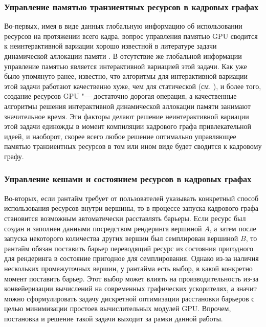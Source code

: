 \subsubsection{Управление памятью транзиентных ресурсов в кадровых графах}
Во-первых, имея в виде данных глобальную информацию об использовании ресурсов на протяжении всего кадра, вопрос управления памятью GPU сводится к неинтерактивной вариации хорошо известной в литературе задачи динамической аллокации памяти \cite[с. 226]{10.5555/574848}.
В отсутствие же глобальной информации управление памятью является интерактивной вариацией этой задачи.
Как уже было упомянуто ранее, известно, что алгоритмы для интерактивной вариации этой задачи работают качественно хуже, чем для статической (см. \cite{robson1971estimate}), и более того, создание ресурсов GPU "--- достаточно дорогая операция, а качественные алгоритмы решения интерактивной динамической аллокации памяти занимают значительное время.
Эти факторы делают решение неинтерактивной вариации этой задачи единожды в момент компиляции кадрового графа привлекательной идеей, и наоборот, скорее всего любое решение оптимально управляющее памятью транзиентных ресурсов в том или ином виде будет сводится к кадровому графу.

\subsubsection{Управление кешами и состоянием ресурсов в кадровых графах}
Во-вторых, если рантайм требует от пользователей указывать конкретный способ использования ресурсов внутри вершины, то в процессе запуска кадрового графа становится возможным автоматически расставлять барьеры.
Если ресурс был создан и заполнен данными посредством рендеринга вершиной $A$, а затем после запуска некоторого количества других вершин был семплирован вершиной $B$, то рантайм обязан поставить барьер переводящий ресурс из состояния пригодного для рендеринга в состояние пригодное для семплирования.
Однако из-за наличия нескольких промежуточных вершин, у рантайма есть выбор, в какой конкретно момент поставить барьер.
Этот выбор может влиять на производительность из-за конвейеризации вычислений на современных графических ускорителях, а значит можно сформулировать задачу дискретной оптимизации расстановки барьеров с целью минимизации простоев вычислительных модулей GPU.
Впрочем, постановка и решение такой задачи выходит за рамки данной работы.

